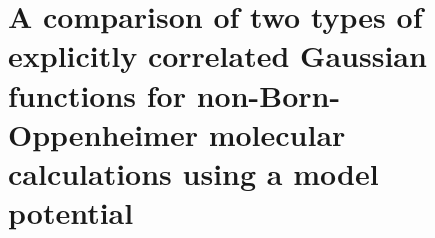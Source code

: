 \chapter{A comparison of two types of explicitly correlated Gaussian functions for
non-Born-Oppenheimer molecular calculations using a model potential\label{apndx15}}



